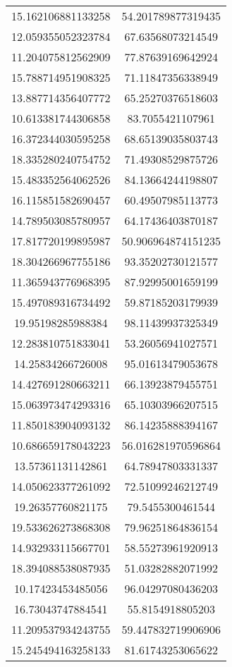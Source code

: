 \begin{table}
\begin{tabular}{cc}
15.162106881133258 & 54.201789877319435 \\
12.059355052323784 & 67.63568073214549 \\
11.204075812562909 & 77.87639169642924 \\
15.788714951908325 & 71.11847356338949 \\
13.887714356407772 & 65.25270376518603 \\
10.613381744306858 & 83.7055421107961 \\
16.372344030595258 & 68.65139035803743 \\
18.335280240754752 & 71.49308529875726 \\
15.483352564062526 & 84.13664244198807 \\
16.115851582690457 & 60.49507985113773 \\
14.789503085780957 & 64.17436403870187 \\
17.817720199895987 & 50.906964874151235 \\
18.304266967755186 & 93.35202730121577 \\
11.365943776968395 & 87.92995001659199 \\
15.497089316734492 & 59.87185203179939 \\
19.95198285988384 & 98.11439937325349 \\
12.283810751833041 & 53.26056941027571 \\
14.25834266726008 & 95.01613479053678 \\
14.427691280663211 & 66.13923879455751 \\
15.063973474293316 & 65.10303966207515 \\
11.850183904093132 & 86.14235888394167 \\
10.686659178043223 & 56.016281970596864 \\
13.57361131142861 & 64.78947803331337 \\
14.050623377261092 & 72.51099246212749 \\
19.26357760821175 & 79.5455300461544 \\
19.533626273868308 & 79.96251864836154 \\
14.932933115667701 & 58.55273961920913 \\
18.394088538087935 & 51.03282882071992 \\
10.17423453485056 & 96.04297080436203 \\
16.73043747884541 & 55.8154918805203 \\
11.209537934243755 & 59.447832719906906 \\
15.245494163258133 & 81.61743253065622 \\

\end{tabular}
\end{table}
